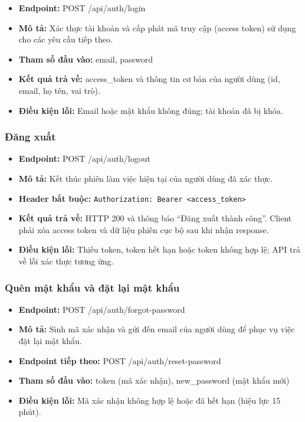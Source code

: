 \begin{itemize}
\item
  \textbf{Endpoint:} POST /api/auth/login
\item
  \textbf{Mô tả:} Xác thực tài khoản và cấp phát mã truy cập (access token) sử dụng cho các yêu cầu tiếp theo.
\item
  \textbf{Tham số đầu vào:} email, password
\item
  \textbf{Kết quả trả về:} access\_token và thông tin cơ bản của người dùng (id, email, họ tên, vai trò).
\item
  \textbf{Điều kiện lỗi:} Email hoặc mật khẩu không đúng; tài khoản đã bị khóa.
\end{itemize}

\subsubsection{Đăng xuất}

\begin{itemize}
\item
  \textbf{Endpoint:} POST /api/auth/logout
\item
  \textbf{Mô tả:} Kết thúc phiên làm việc hiện tại của người dùng đã xác thực.
\item
  \textbf{Header bắt buộc:} \texttt{Authorization: Bearer <access\_token>}
\item
  \textbf{Kết quả trả về:} HTTP 200 và thông báo ``Đăng xuất thành công''. Client phải xóa access token và dữ liệu phiên cục bộ sau khi nhận response.
\item
  \textbf{Điều kiện lỗi:} Thiếu token, token hết hạn hoặc token không hợp lệ; API trả về lỗi xác thực tương ứng.
\end{itemize}

\subsubsection{Quên mật khẩu và đặt lại mật khẩu}

\begin{itemize}
\item
  \textbf{Endpoint:} POST /api/auth/forgot-password
\item
  \textbf{Mô tả:} Sinh mã xác nhận và gửi đến email của người dùng để phục vụ việc đặt lại mật khẩu.
\item
  \textbf{Endpoint tiếp theo:} POST /api/auth/reset-password
\item
  \textbf{Tham số đầu vào:} token (mã xác nhận), new\_password (mật khẩu mới)
\item
  \textbf{Điều kiện lỗi:} Mã xác nhận không hợp lệ hoặc đã hết hạn (hiệu lực 15 phút).
\end{itemize}

